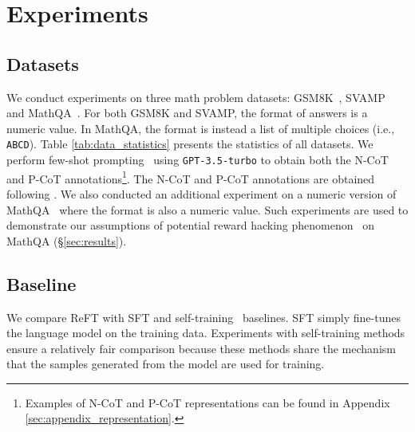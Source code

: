 \section{Experiments}

\subsection{Datasets}
We conduct experiments on three math problem datasets: GSM8K~\cite{cobbe2021training}, SVAMP~\cite{patel2021nlp} and MathQA~\cite{amini2019mathqa}.
For both GSM8K and SVAMP, the format of answers is a numeric value.
In MathQA, the format is instead a list of multiple choices (i.e., \texttt{ABCD}).
Table \ref{tab:data_statistics} presents the statistics of all datasets.
We perform few-shot prompting~\cite{wei2022chain,gao2023pal} using \texttt{GPT-3.5-turbo} to obtain both the N-CoT and P-CoT annotations\footnote{Examples of N-CoT and P-CoT representations can be found in Appendix \ref{sec:appendix_representation}.}.
The N-CoT and P-CoT annotations are obtained following \citet{jie2023design}.
We also conducted an additional experiment on a numeric version of MathQA~\cite{jie2023leveraging} where the format is also a numeric value.
Such experiments are used to demonstrate our assumptions of potential reward hacking phenomenon~\cite{skalse2022defining} on MathQA (\S\ref{sec:results}).

\begin{table}[t!]
    \centering
\caption{Statistics of the train and test datasets.}
\label{tab:data_statistics}
\end{table}

\subsection{Baseline}
\label{sec:baseline}
We compare ReFT with SFT and self-training~\cite{xie2020self,amini2022self} baselines.
SFT simply fine-tunes the language model on the training data.
Experiments with self-training methods ensure a relatively fair comparison because these methods share the mechanism that the samples generated from the model are used for training.

